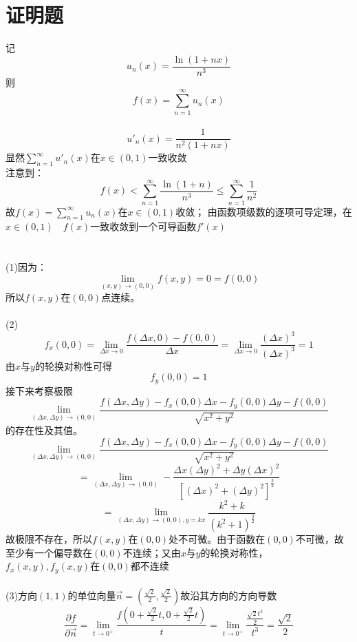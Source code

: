 \documentclass[UTF8]{ctexart}
\begin{document}
\part{证明题}
记\[u_n(x)=\frac{\ln(1+nx)}{n^3}\]则\[f(x)=\sum_{n=1}^\infty u_n(x)\]\\
\[u'_n(x)=\frac{1}{n^2(1+nx)}\]
显然$\sum_{n=1}^\infty u'_n(x)$在$x\in (0,1)$一致收敛\\
注意到：
\[f(x)<\sum_{n=1}^\infty\frac{\ln (1+n)}{n^3}\leq \sum_{n=1}^\infty\frac{1}{n^2}\]
故$f(x)=\sum_{n=1}^\infty u_n(x)$在$x\in (0,1)$收敛；
由函数项级数的逐项可导定理，在$x\in (0,1)\quad f(x)$一致收敛到一个可导函数$f'(x)$
\part{}
(1)因为：
\[\lim_{(x,y)  \to  (0,0)}f(x,y)=0=f(0,0)\]
所以$f(x,y)$在$(0,0)$点连续。\\\\
\phantom{空格}(2)
\[
    f_x(0,0)=\lim_{\Delta x  \to  0}\frac{f(\Delta x,0)-f(0,0)}{\Delta x}=\lim_{\Delta x  \to  0}\frac{(\Delta x)^3}{(\Delta x)^3}=1\]
由$x$与$y$的轮换对称性可得\[f_y(0,0)=1\]
接下来考察极限\[
    \lim_{(\Delta x,\Delta y)  \to  (0,0)}\frac{f(\Delta x,\Delta y)-f_x(0,0)\Delta x-f_y(0,0)\Delta y-f(0,0)}{\sqrt{x^2+y^2}}\]
的存在性及其值。
\[
    \lim_{(\Delta x,\Delta y)  \to  (0,0)}\frac{f(\Delta x,\Delta y)-f_x(0,0)\Delta x-f_y(0,0)\Delta y-f(0,0)}{\sqrt{x^2+y^2}}\]
\[=\lim_{(\Delta x,\Delta y) \to (0,0)}-\frac{\Delta x(\Delta y)^2+\Delta y(\Delta x)^2}{[(\Delta x)^2+(\Delta y)^2]^{\frac{3}{2}}}\]
\[ =\lim_{(\Delta x,\Delta y) \to  (0,0),y=kx}\frac{k^2+k}{(k^2+1)^{\frac{3}{2}}}\]
故极限不存在，所以$f(x,y)$在$(0,0)$处不可微。由于函数在$(0,0)$不可微，故至少有一个偏导数在$(0,0)$不连续；又由$x$与$y$的轮换对称性，$f_x(x,y),f_y(x,y)$在$(0,0)$都不连续\\\\
\phantom{空格}(3)方向$(1,1)$的单位向量$\vec n=(\frac{\sqrt 2}{2},\frac{\sqrt 2}{2})$故沿其方向的方向导数
\[\frac{\partial f}{\partial \vec{n}}=\lim_{ t  \to  0^+}\frac{f(0+\frac{\sqrt{2}}{2}t,0+\frac{\sqrt{2}}{2}t)}{t}=\lim_{ t  \to  0^+}\frac{\frac{\sqrt{2}t^3}{2}}{t^3}=\frac{\sqrt{2}}{2}\]
\end{document}
